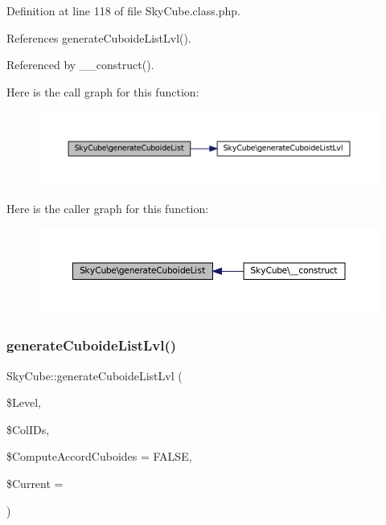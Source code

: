 Definition at line 118 of file Sky\+Cube.\+class.\+php.



References generate\+Cuboide\+List\+Lvl().



Referenced by \+\_\+\+\_\+construct().

Here is the call graph for this function\+:\nopagebreak
\begin{figure}[H]
\begin{center}
\leavevmode
\includegraphics[width=350pt]{class_sky_cube_a66b8cb4ff0f25754d2384224c7e40ced_cgraph}
\end{center}
\end{figure}
Here is the caller graph for this function\+:\nopagebreak
\begin{figure}[H]
\begin{center}
\leavevmode
\includegraphics[width=350pt]{class_sky_cube_a66b8cb4ff0f25754d2384224c7e40ced_icgraph}
\end{center}
\end{figure}
\mbox{\label{class_sky_cube_a19cef89f0ed6c66283b68fb9b4dcafa6}} 
\subsubsection{\texorpdfstring{generate\+Cuboide\+List\+Lvl()}{generateCuboideListLvl()}}
{\footnotesize\ttfamily Sky\+Cube\+::generate\+Cuboide\+List\+Lvl (\begin{DoxyParamCaption}\item[{}]{\$\+Level,  }\item[{}]{\$\+Col\+I\+Ds,  }\item[{}]{\$\+Compute\+Accord\+Cuboides = {\ttfamily FALSE},  }\item[{}]{\$\+Current = {\ttfamily \textquotesingle{}\textquotesingle{}} }\end{DoxyParamCaption})\hspace{0.3cm}{\ttfamily [protected]}}

